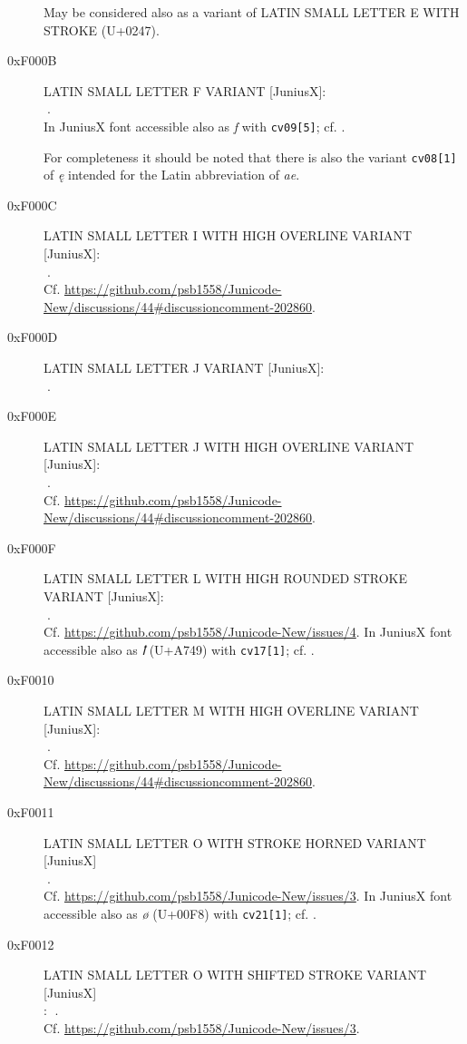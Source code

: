 \documentclass{article}
\newcommand{\Jglyph}[1]{{\relsize{2}\J#1}}
\begin{document}
\begin{description}
 May be considered also as a variant of LATIN SMALL LETTER E WITH
  STROKE (U+0247).

\item [0xF000B] LATIN SMALL LETTER F VARIANT [JuniusX]:\\
  \Jglyph{󰀋}.\\ %
  In JuniusX font accessible also as \textit{f} with \texttt{cv09[5]};
  cf. \autocite[p. 9]{baker20:_opent_featur_junius_junius}.

  For completeness it should be noted that there is also the variant
  \texttt{cv08[1]} of \textit{ę} intended for the Latin abbreviation
  of \textit{ae}.
  
\item [0xF000C] LATIN SMALL LETTER I WITH HIGH OVERLINE VARIANT [JuniusX]:\\
  \Jglyph{󰀌}.\\ Cf. \url{https://github.com/psb1558/Junicode-New/discussions/44#discussioncomment-202860}.
\item [0xF000D] LATIN SMALL LETTER J VARIANT [JuniusX]:\\
  \Jglyph{󰀍}.\\ %

\item [0xF000E] LATIN SMALL LETTER J WITH HIGH OVERLINE  VARIANT [JuniusX]:\\
  \Jglyph{󰀎}.\\ Cf. \url{https://github.com/psb1558/Junicode-New/discussions/44#discussioncomment-202860}.
\item [0xF000F] LATIN SMALL LETTER L WITH HIGH ROUNDED STROKE VARIANT [JuniusX]:\\
  \Jglyph{󰀏}.\\  Cf. \url{https://github.com/psb1558/Junicode-New/issues/4}.
  In JuniusX font accessible also as \textit{ꝉ} (U+A749) with \texttt{cv17[1]};
  cf. \autocite[p. 9]{baker20:_opent_featur_junius_junius}.

  
\item [0xF0010] LATIN SMALL LETTER M WITH HIGH OVERLINE VARIANT [JuniusX]:\\
  \Jglyph{󰀐}.\\ Cf. \url{https://github.com/psb1558/Junicode-New/discussions/44#discussioncomment-202860}.
 \item [0xF0011] LATIN SMALL LETTER O WITH STROKE HORNED VARIANT [JuniusX]\\
  \Jglyph{󰀑}.\\  Cf. \url{https://github.com/psb1558/Junicode-New/issues/3}.
  In JuniusX font accessible also as \textit{ø} (U+00F8) with \texttt{cv21[1]};
  cf. \autocite[p. 9]{baker20:_opent_featur_junius_junius}.
\item [0xF0012] LATIN SMALL LETTER O WITH SHIFTED STROKE VARIANT [JuniusX]\\:
  \Jglyph{󰀒}.\\  Cf. \url{https://github.com/psb1558/Junicode-New/issues/3}.


\end{description}
\end{document}
